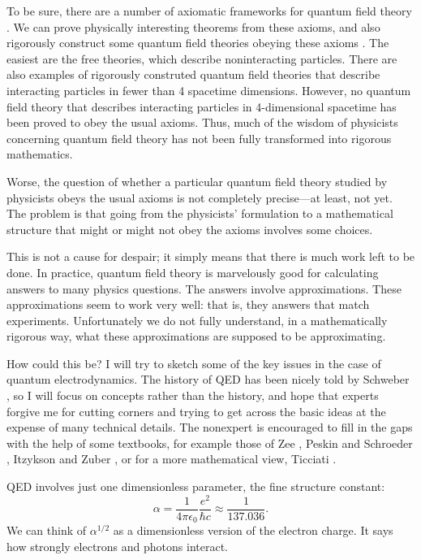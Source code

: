 \documentclass{article}
\begin{document}
To be sure, there are a number of axiomatic frameworks for quantum field theory \cite{Haag,StreaterWightman}.  We can prove physically interesting theorems  from these axioms, and also rigorously construct some quantum field theories obeying these axioms \cite{BSZ,GlimmJaffe,Rivasseau}.  The easiest are the free theories,  which describe noninteracting particles.  There are also examples of rigorously  construted quantum field theories that describe interacting particles in fewer than 4 spacetime dimensions.  However, no quantum field theory that describes interacting particles in 4-dimensional spacetime has been proved to obey the usual axioms.   Thus, much of the wisdom of physicists concerning quantum field theory has not been fully transformed into rigorous mathematics.  

Worse, the question of whether a particular quantum field theory studied by physicists obeys the usual axioms is not completely precise---at least, not yet.  The problem is that going from the physicists' formulation to a mathematical structure that might or might not obey the axioms involves some choices.

This is not a cause for despair; it simply means that there is much work left to be done. In practice, quantum field theory is marvelously good for calculating answers to many physics questions.  The answers involve approximations.   These approximations seem to work very well: that is, they answers that match experiments.  Unfortunately we do not fully understand, in a mathematically rigorous way, what these approximations are supposed to be approximating.

How could this be?  I will try to sketch some of the key issues in the case of quantum electrodynamics.  The history of QED has been nicely told by Schweber \cite{Schweber}, so I will focus on concepts rather than the history, and hope that experts forgive me for cutting corners and trying to get across the basic ideas at the expense of many technical details.  The nonexpert is encouraged to fill in the gaps with the help of some textbooks, for example those of Zee \cite{Zee}, Peskin and Schroeder \cite{PS}, Itzykson and Zuber \cite{IZ}, or for a more mathematical view, Ticciati \cite{Ticciati}.

QED involves just one dimensionless parameter, the fine structure constant:
\[   \alpha = \frac{1}{4 \pi \epsilon_0} \frac{e^2}{\hbar c} \approx \frac{1}{137.036} .\]
We can think of $\alpha^{1/2}$ as a dimensionless version of the electron charge.  It  says how strongly electrons and photons interact.   
\end{document}
